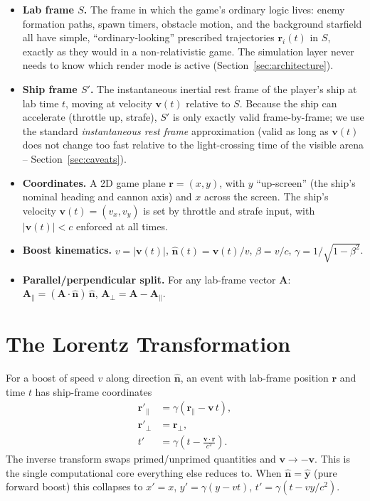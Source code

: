 \documentclass[11pt]{article}
\newcommand{\vb}[1]{\mathbf{#1}}
\newcommand{\uv}[1]{\hat{\mathbf{#1}}}
\newcommand{\pperp}{{\perp}}
\newcommand{\ppar}{{\parallel}}
\begin{document}
\begin{itemize}[leftmargin=1.5em]
  \item \textbf{Lab frame $S$.} The frame in which the game's ordinary logic lives: enemy formation paths, spawn timers, obstacle motion, and the background starfield all have simple, ``ordinary-looking'' prescribed trajectories $\vb{r}_i(t)$ in $S$, exactly as they would in a non-relativistic game. The simulation layer never needs to know which render mode is active (Section~\ref{sec:architecture}).
  \item \textbf{Ship frame $S'$.} The instantaneous inertial rest frame of the player's ship at lab time $t$, moving at velocity $\vb{v}(t)$ relative to $S$. Because the ship can accelerate (throttle up, strafe), $S'$ is only exactly valid frame-by-frame; we use the standard \emph{instantaneous rest frame} approximation (valid as long as $\vb v(t)$ does not change too fast relative to the light-crossing time of the visible arena -- Section~\ref{sec:caveats}).
  \item \textbf{Coordinates.} A 2D game plane $\vb r = (x,y)$, with $y$ ``up-screen'' (the ship's nominal heading and cannon axis) and $x$ across the screen. The ship's velocity $\vb v(t) = (v_x, v_y)$ is set by throttle and strafe input, with $|\vb v(t)| < c$ enforced at all times.
  \item \textbf{Boost kinematics.} $v = |\vb v(t)|$, $\uv n(t) = \vb v(t)/v$, $\beta = v/c$, $\gamma = 1/\sqrt{1-\beta^2}$.
  \item \textbf{Parallel/perpendicular split.} For any lab-frame vector $\vb A$: $\vb A_\ppar = (\vb A\cdot\uv n)\,\uv n$, $\vb A_\pperp = \vb A - \vb A_\ppar$.
\end{itemize}

\section{The Lorentz Transformation}
\label{sec:lorentz}

For a boost of speed $v$ along direction $\uv n$, an event with lab-frame position $\vb r$ and time $t$ has ship-frame coordinates
\begin{align}
  \vb r'_\ppar &= \gamma\left(\vb r_\ppar - \vb v\, t\right), \label{eq:lorentz-rpar}\\
  \vb r'_\pperp &= \vb r_\pperp, \label{eq:lorentz-rperp}\\
  t' &= \gamma\left(t - \frac{\vb v\cdot\vb r}{c^2}\right). \label{eq:lorentz-t}
\end{align}
The inverse transform swaps primed/unprimed quantities and $\vb v \to -\vb v$. This is the single computational core everything else reduces to. When $\uv n = \uv y$ (pure forward boost) this collapses to $x'=x$, $y'=\gamma(y-vt)$, $t'=\gamma(t-vy/c^2)$.
\end{document}
